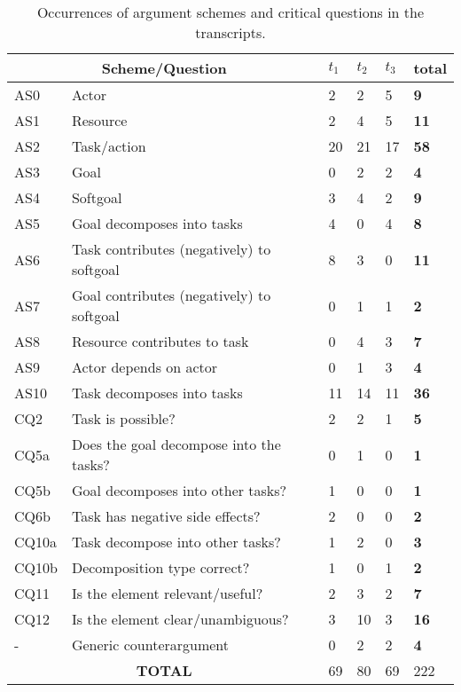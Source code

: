 \begin{table}[t]
\centering
\begin{tabularx}{0.5\textwidth}{|l|X|l|l|l|>{\bfseries}l|}
\hline
\multicolumn{2}{|c|}{\textbf{Scheme/Question}} & $t_1$ & $t_2$ & $t_3$ & \textbf{total}\\
\hline 
AS0 & Actor & 2 & 2 & 5 & 9\\
\hline
AS1 & Resource & 2 & 4 & 5 & 11\\
\hline
AS2 & Task/action & 20 & 21 & 17 & 58\\
\hline
AS3 & Goal & 0 & 2 & 2 & 4\\
\hline
AS4 & Softgoal & 3 & 4 & 2 & 9\\
\hline
AS5 & Goal decomposes into tasks & 4 &0& 4 & 8\\
\hline
AS6 & Task contributes (negatively) to softgoal & 8 & 3 &0& 11\\
\hline
AS7 & Goal contributes (negatively) to softgoal &0& 1 & 1 & 2\\
\hline
AS8 & Resource contributes to task & 0 & 4 & 3 & 7\\
\hline
AS9 & Actor depends on actor &0& 1 & 3 & 4\\
\hline
AS10 & Task decomposes into tasks & 11 &14 &11 &36\\ 
\hline
\hline
CQ2 & Task is possible? & 2 & 2 & 1 & 5\\
\hline		
CQ5a & Does the goal decompose into the tasks? & 0 & 1 & 0 & 1\\
\hline
CQ5b & Goal decomposes into other tasks? & 1 & 0 & 0 & 1\\
\hline
CQ6b & Task has negative side effects? & 2 & 0 & 0 & 2\\
\hline
CQ10a & Task decompose into other tasks? & 1 &2 &0&3\\
\hline
CQ10b & Decomposition type correct? &1 &0& 1 &2\\
\hline
\hline
CQ11 & Is the element relevant/useful? & 2 & 3 & 2 &7\\
\hline
CQ12 & Is the element clear/unambiguous? &3 &10 & 3 & 16\\
\hline
\hline
- & Generic counterargument & 0& 2 & 2 & 4\\
\hline
\hline
\multicolumn{2}{|c|}{\textbf{TOTAL}}&69&80&69&222\\
\hline
\end{tabularx}
\caption{Occurrences of argument schemes and critical questions in the transcripts.}
\label{table:transcripts:results:argumentschemes}
\end{table}

